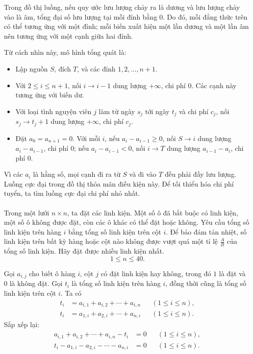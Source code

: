 \documentclass[11pt]{article}
\begin{document}
Trong đồ thị luồng, nếu quy ước lưu lượng chảy ra là dương và lưu lượng chảy
vào là âm, tổng đại số lưu lượng tại mỗi đỉnh bằng \(0\). Do đó, mỗi đẳng
thức trên có thể tương ứng với một đỉnh; mỗi biến xuất hiện một lần dương và
một lần âm nên tương ứng với một cạnh giữa hai đỉnh.

Từ cách nhìn này, mô hình tổng quát là:
\begin{itemize}
  \item Lập nguồn \(S\), đích \(T\), và các đỉnh \(1,2,\ldots,n+1\).
  \item Với \(2\le i\le n+1\), nối \(i\to i-1\) dung lượng \(+\infty\), chi
  phí \(0\). Các cạnh này tương ứng với biến dư.
  \item Với loại tình nguyện viên \(j\) làm từ ngày \(s_j\) tới ngày \(t_j\)
  và chi phí \(c_j\), nối \(s_j\to t_j+1\) dung lượng \(+\infty\), chi phí
  \(c_j\).
  \item Đặt \(a_0=a_{n+1}=0\). Với mỗi \(i\), nếu \(a_i-a_{i-1}\ge 0\), nối
  \(S\to i\) dung lượng \(a_i-a_{i-1}\), chi phí \(0\); nếu \(a_i-a_{i-1}<0\),
  nối \(i\to T\) dung lượng \(a_{i-1}-a_i\), chi phí \(0\).
\end{itemize}

Vì các \(a_i\) là hằng số, mọi cạnh đi ra từ \(S\) và đi vào \(T\) đều phải
đầy lưu lượng. Luồng cực đại trong đồ thị thỏa mãn điều kiện này. Để tối thiểu
hóa chi phí tuyển, ta tìm luồng cực đại chi phí nhỏ nhất.

\paragraph{}
Trong một lưới \(n\times n\), ta đặt các linh kiện. Một số ô đã bắt buộc có
linh kiện, một số ô không được đặt, còn các ô khác có thể đặt hoặc không. Yêu
cầu tổng số linh kiện trên hàng \(i\) bằng tổng số linh kiện trên cột \(i\).
Để bảo đảm tản nhiệt, số linh kiện trên bất kỳ hàng hoặc cột nào không được
vượt quá một tỉ lệ \(\frac{A}{B}\) của tổng số linh kiện. Hãy đặt được nhiều
linh kiện nhất.
\[
  1\le n\le 40.
\]

Gọi \(a_{i,j}\) cho biết ô hàng \(i\), cột \(j\) có đặt linh kiện hay không,
trong đó \(1\) là đặt và \(0\) là không đặt. Gọi \(t_i\) là tổng số linh kiện
trên hàng \(i\), đồng thời cũng là tổng số linh kiện trên cột \(i\). Ta có
\[
\begin{aligned}
  t_i &= a_{i,1}+a_{i,2}+\cdots+a_{i,n} &&(1\le i\le n),\\
  t_i &= a_{1,i}+a_{2,i}+\cdots+a_{n,i} &&(1\le i\le n).
\end{aligned}
\]
Sắp xếp lại:
\[
\begin{aligned}
  a_{i,1}+a_{i,2}+\cdots+a_{i,n}-t_i &=0 &&(1\le i\le n),\\
  t_i-a_{1,i}-a_{2,i}-\cdots-a_{n,i} &=0 &&(1\le i\le n).
\end{aligned}
\]
\end{document}
